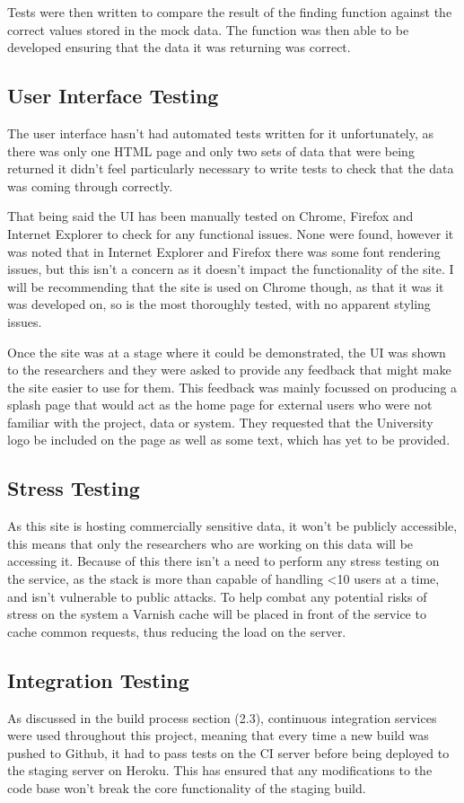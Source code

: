 Tests were then written to compare the result of the finding function against the correct values stored in the mock data. The function was then able to be developed ensuring that the data it was returning was correct. 

\subsection{User Interface Testing}
The user interface hasn't had automated tests written for it unfortunately, as there was only one HTML page and only two sets of data that were being returned it didn't feel particularly necessary to write tests to check that the data was coming through correctly. 

That being said the UI has been manually tested on Chrome, Firefox and Internet Explorer to check for any functional issues. None were found, however it was noted that in Internet Explorer and Firefox there was some font rendering issues, but this isn't a concern as it doesn't impact the functionality of the site. I will be recommending that the site is used on Chrome though, as that it was it was developed on, so is the most thoroughly tested, with no apparent styling issues. 

Once the site was at a stage where it could be demonstrated, the UI was shown to the researchers and they were asked to provide any feedback that might make the site easier to use for them. This feedback was mainly focussed on producing a splash page that would act as the home page for external users who were not familiar with the project, data or system. They requested that the University logo be included on the page as well as some text, which has yet to be provided.

\subsection{Stress Testing}
As this site is hosting commercially sensitive data, it won't be publicly accessible, this means that only the researchers who are working on this data will be accessing it. Because of this there isn't a need to perform any stress testing on the service, as the stack is more than capable of handling \textless 10 users at a time, and isn't vulnerable to public attacks. To help combat any potential risks of stress on the system a Varnish\cite{varnish} cache will be placed in front of the service to cache common requests, thus reducing the load on the server. 

\subsection{Integration Testing}
As discussed in the build process section (2.3), continuous integration services were used throughout this project, meaning that every time a new build was pushed to Github, it had to pass tests on the CI server before being deployed to the staging server on Heroku. This has ensured that any modifications to the code base won't break the core functionality of the staging build. 

